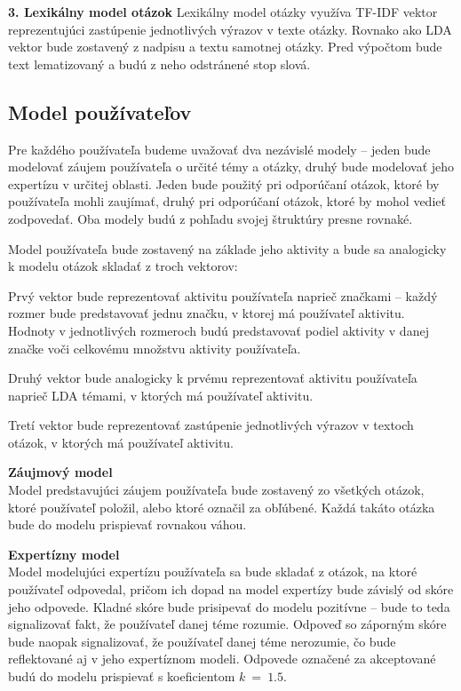 \textbf{3. Lexikálny model otázok}
Lexikálny model otázky využíva TF-IDF vektor reprezentujúci zastúpenie jednotlivých výrazov v texte otázky. Rovnako ako
LDA vektor bude zostavený z nadpisu a textu samotnej otázky. Pred výpočtom bude text lematizovaný a budú z neho odstránené
stop slová.


\subsection{Model používateľov}

Pre každého používateľa budeme uvažovať dva nezávislé modely -- jeden bude modelovať záujem používateľa o určité témy a otázky,
druhý bude modelovať jeho expertízu v určitej oblasti. Jeden bude použitý
pri odporúčaní otázok, ktoré by používateľa mohli zaujímať, druhý pri odporúčaní otázok, ktoré by mohol vedieť zodpovedať.
Oba modely budú z pohľadu svojej štruktúry presne rovnaké.

Model používateľa bude zostavený na základe jeho aktivity a bude sa analogicky k modelu otázok skladať z troch vektorov:

\begin{my_enumerate}
\item{
  Prvý vektor bude reprezentovať aktivitu používateľa naprieč značkami -- každý rozmer bude predstavovať jednu značku,
  v ktorej má používateľ aktivitu. Hodnoty v jednotlivých rozmeroch budú predstavovať podiel aktivity v danej značke voči
  celkovému množstvu aktivity používateľa.
}
\item{
  Druhý vektor bude analogicky k prvému reprezentovať aktivitu používateľa naprieč LDA témami, v ktorých má používateľ aktivitu.
}
\item{
  Tretí vektor bude reprezentovať zastúpenie jednotlivých výrazov v textoch otázok, v ktorých má používateľ aktivitu.
}
\end{my_enumerate}

\textbf{Záujmový model}\\
Model predstavujúci záujem používateľa bude zostavený zo všetkých otázok, ktoré používateľ položil, alebo ktoré označil
za obľúbené. Každá takáto otázka bude do modelu prispievať rovnakou váhou.

\textbf{Expertízny model}\\
Model modelujúci expertízu používateľa sa bude skladať z otázok, na ktoré používateľ odpovedal, pričom ich dopad na model
expertízy bude závislý od skóre jeho odpovede. Kladné skóre bude prisipevať do modelu pozitívne -- bude to teda signalizovať
fakt, že používateľ danej téme rozumie. Odpoveď so záporným skóre bude naopak signalizovať, že používateľ danej téme nerozumie,
čo bude reflektované aj v jeho expertíznom modeli. Odpovede označené za akceptované budú do modelu prispievať s koeficientom $k~=~1.5$.

